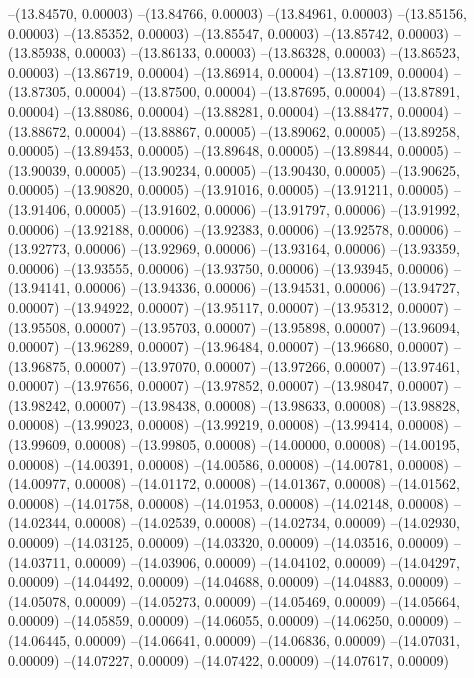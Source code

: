 --(13.84570, 0.00003)
--(13.84766, 0.00003)
--(13.84961, 0.00003)
--(13.85156, 0.00003)
--(13.85352, 0.00003)
--(13.85547, 0.00003)
--(13.85742, 0.00003)
--(13.85938, 0.00003)
--(13.86133, 0.00003)
--(13.86328, 0.00003)
--(13.86523, 0.00003)
--(13.86719, 0.00004)
--(13.86914, 0.00004)
--(13.87109, 0.00004)
--(13.87305, 0.00004)
--(13.87500, 0.00004)
--(13.87695, 0.00004)
--(13.87891, 0.00004)
--(13.88086, 0.00004)
--(13.88281, 0.00004)
--(13.88477, 0.00004)
--(13.88672, 0.00004)
--(13.88867, 0.00005)
--(13.89062, 0.00005)
--(13.89258, 0.00005)
--(13.89453, 0.00005)
--(13.89648, 0.00005)
--(13.89844, 0.00005)
--(13.90039, 0.00005)
--(13.90234, 0.00005)
--(13.90430, 0.00005)
--(13.90625, 0.00005)
--(13.90820, 0.00005)
--(13.91016, 0.00005)
--(13.91211, 0.00005)
--(13.91406, 0.00005)
--(13.91602, 0.00006)
--(13.91797, 0.00006)
--(13.91992, 0.00006)
--(13.92188, 0.00006)
--(13.92383, 0.00006)
--(13.92578, 0.00006)
--(13.92773, 0.00006)
--(13.92969, 0.00006)
--(13.93164, 0.00006)
--(13.93359, 0.00006)
--(13.93555, 0.00006)
--(13.93750, 0.00006)
--(13.93945, 0.00006)
--(13.94141, 0.00006)
--(13.94336, 0.00006)
--(13.94531, 0.00006)
--(13.94727, 0.00007)
--(13.94922, 0.00007)
--(13.95117, 0.00007)
--(13.95312, 0.00007)
--(13.95508, 0.00007)
--(13.95703, 0.00007)
--(13.95898, 0.00007)
--(13.96094, 0.00007)
--(13.96289, 0.00007)
--(13.96484, 0.00007)
--(13.96680, 0.00007)
--(13.96875, 0.00007)
--(13.97070, 0.00007)
--(13.97266, 0.00007)
--(13.97461, 0.00007)
--(13.97656, 0.00007)
--(13.97852, 0.00007)
--(13.98047, 0.00007)
--(13.98242, 0.00007)
--(13.98438, 0.00008)
--(13.98633, 0.00008)
--(13.98828, 0.00008)
--(13.99023, 0.00008)
--(13.99219, 0.00008)
--(13.99414, 0.00008)
--(13.99609, 0.00008)
--(13.99805, 0.00008)
--(14.00000, 0.00008)
--(14.00195, 0.00008)
--(14.00391, 0.00008)
--(14.00586, 0.00008)
--(14.00781, 0.00008)
--(14.00977, 0.00008)
--(14.01172, 0.00008)
--(14.01367, 0.00008)
--(14.01562, 0.00008)
--(14.01758, 0.00008)
--(14.01953, 0.00008)
--(14.02148, 0.00008)
--(14.02344, 0.00008)
--(14.02539, 0.00008)
--(14.02734, 0.00009)
--(14.02930, 0.00009)
--(14.03125, 0.00009)
--(14.03320, 0.00009)
--(14.03516, 0.00009)
--(14.03711, 0.00009)
--(14.03906, 0.00009)
--(14.04102, 0.00009)
--(14.04297, 0.00009)
--(14.04492, 0.00009)
--(14.04688, 0.00009)
--(14.04883, 0.00009)
--(14.05078, 0.00009)
--(14.05273, 0.00009)
--(14.05469, 0.00009)
--(14.05664, 0.00009)
--(14.05859, 0.00009)
--(14.06055, 0.00009)
--(14.06250, 0.00009)
--(14.06445, 0.00009)
--(14.06641, 0.00009)
--(14.06836, 0.00009)
--(14.07031, 0.00009)
--(14.07227, 0.00009)
--(14.07422, 0.00009)
--(14.07617, 0.00009)
